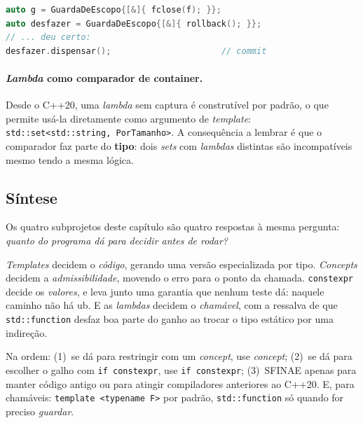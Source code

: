 \begin{lstlisting}[style=bt, language=C++,
    caption={Limpeza e \emph{rollback} com o mesmo mecanismo.}]
auto g = GuardaDeEscopo{[&]{ fclose(f); }};
auto desfazer = GuardaDeEscopo{[&]{ rollback(); }};
// ... deu certo:
desfazer.dispensar();                      // commit
\end{lstlisting}

\paragraph{\emph{Lambda} como comparador de container.} Desde o C++20, uma
\emph{lambda} sem captura é construtível por padrão, o que permite usá-la
diretamente como argumento de \emph{template}:
\texttt{std::set<std::string, PorTamanho>}. A consequência a lembrar é que o
comparador faz parte do \textbf{tipo}: dois \emph{sets} com \emph{lambdas}
distintas são incompatíveis mesmo tendo a mesma lógica.

\subsection{Síntese}

Os quatro subprojetos deste capítulo são quatro respostas à mesma pergunta:
\emph{quanto do programa dá para decidir antes de rodar?}

\emph{Templates} decidem o \emph{código}, gerando uma versão especializada por
tipo. \emph{Concepts} decidem a \emph{admissibilidade}, movendo o erro para o
ponto da chamada. \texttt{constexpr} decide os \emph{valores}, e leva junto uma
garantia que nenhum teste dá: naquele caminho não há \gls{ub}. E as
\emph{lambdas} decidem o \emph{chamável}, com a ressalva de que
\texttt{std::function} desfaz boa parte do ganho ao trocar o tipo estático por
uma indireção.

\begin{regra}
Na ordem: (1)~se dá para restringir com um \emph{concept}, use \emph{concept};
(2)~se dá para escolher o galho com \texttt{if constexpr}, use \texttt{if
constexpr}; (3)~SFINAE apenas para manter código antigo ou para atingir
compiladores anteriores ao C++20. E, para chamáveis: \texttt{template <typename
F>} por padrão, \texttt{std::function} só quando for preciso \emph{guardar}.
\end{regra}
